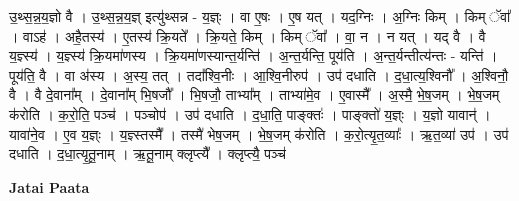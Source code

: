 \documentclass[17pt]{extarticle}
\begin{document}
उ॒थ्स॒न्न॒य॒ज्ञो वै । उ॒थ्स॒न्न॒य॒ज्ञ् इत्यु॑थ्सन्न - य॒ज्ञ्ः । 
वा ए॒षः । ए॒ष यत् । यद॒ग्निः । अ॒ग्निः किम् । किम् ॅवा᳚ । वाऽह॑ । अहै॒तस्य॑ । ए॒तस्य॑ क्रि॒यते᳚ । क्रि॒यते॒ किम् । किम् ॅवा᳚ । वा॒ न । न यत् । यद् वै । वै य॒ज्ञ्स्य॑ । य॒ज्ञ्स्य॑ क्रि॒यमा॑णस्य । क्रि॒यमा॑णस्यान्त॒र्यन्ति॑ । अ॒न्त॒र्यन्ति॒ पूय॑ति । अ॒न्त॒र्यन्तीत्य॑न्तः - यन्ति॑ । पूय॑ति॒ वै । वा अ॑स्य । अ॒स्य॒ तत् । तदा᳚श्वि॒नीः । आ॒श्वि॒नीरुप॑ । उप॑ दधाति । द॒धा॒त्य॒श्विनौ᳚ । अ॒श्विनौ॒ वै । वै दे॒वाना᳚म् । दे॒वाना᳚म् भि॒षजौ᳚ । भि॒षजौ॒ ताभ्या᳚म् । ताभ्या॑मे॒व । ए॒वास्मै᳚ । अ॒स्मै॒ भे॒ष॒जम् । भे॒ष॒जम् क॑रोति । क॒रो॒ति॒ पञ्च॑ । पञ्चोप॑ । उप॑ दधाति । द॒धा॒ति॒ पाङ्क्तः॑ । पाङ्क्तो॑ य॒ज्ञ्ः । य॒ज्ञो यावान्॑ । यावा॑ने॒व । ए॒व य॒ज्ञ्ः । य॒ज्ञ्स्तस्मै᳚ । तस्मै॑ भेष॒जम् । भे॒ष॒जम् क॑रोति । क॒रो॒त्यृ॒त॒व्याः᳚ । ऋ॒त॒व्या॑ उप॑ । उप॑ दधाति । द॒धा॒त्यृ॒तू॒नाम् । ऋ॒तू॒नाम् क्लृप्त्यै᳚ । क्लृप्त्यै॒ पञ्च॑ \newline

\textbf{Jatai Paata} \newline
\end{document}
